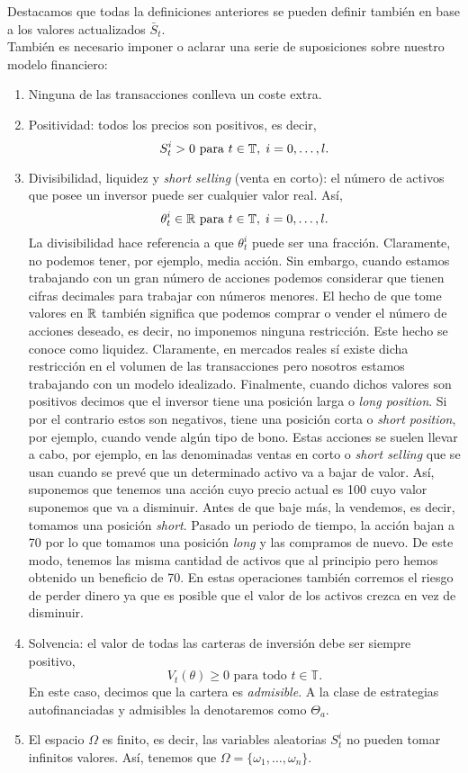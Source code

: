 Destacamos que todas la definiciones anteriores se pueden definir también en base a los valores actualizados $ \bar{S}_t $. \\

También es necesario imponer o aclarar una serie de suposiciones sobre nuestro modelo financiero:
\begin{enumerate}
	\item Ninguna de las transacciones conlleva un coste extra.
	\item Positividad: todos los precios son positivos, es decir,
	\[
	S_t^i > 0 \text{ para } t \in \mathbb{T},\hspace{1mm} i=0,\dots,l.
	\]
	\item Divisibilidad, liquidez y \textit{short selling} (venta en corto): el número de activos que posee un inversor puede ser cualquier valor real. Así,
	\[
	\theta_t^i \in \mathbb{R} \text{ para } t \in \mathbb{T},\hspace{1mm} i=0,\dots,l.
	\]
	La divisibilidad hace referencia a que $ \theta_t^i $ puede ser una fracción. Claramente, no podemos tener, por ejemplo, media acción. Sin embargo, cuando estamos trabajando con un gran número de acciones podemos considerar que tienen cifras decimales para trabajar con números menores. El hecho de que tome valores en $ \mathbb{R} $ también significa que podemos comprar o vender el número de acciones deseado, es decir, no imponemos ninguna restricción. Este hecho se conoce como liquidez. Claramente, en mercados reales sí existe dicha restricción en el volumen de las transacciones pero nosotros estamos trabajando con un modelo idealizado. Finalmente, cuando dichos valores son positivos decimos que el inversor tiene una posición larga o \textit{long position}. Si por el contrario estos son negativos, tiene una posición corta o \textit{short position}, por ejemplo, cuando vende algún tipo de bono. Estas acciones se suelen llevar a cabo, por ejemplo, en las denominadas ventas en corto o \textit{short selling} que se usan cuando se prevé que un determinado activo va a bajar de valor. Así, suponemos que tenemos una acción cuyo precio actual es 100 cuyo valor suponemos que va a disminuir. Antes de que baje más, la vendemos, es decir, tomamos una posición \textit{short}. Pasado un periodo de tiempo, la acción bajan a 70 por lo que tomamos una posición \textit{long} y las compramos de nuevo. De este modo, tenemos las misma cantidad de activos que al principio pero hemos obtenido un beneficio de 70. En estas operaciones también corremos el riesgo de perder dinero ya que es posible que el valor de los activos crezca en vez de disminuir. 
	
	\item Solvencia: el valor de todas las carteras de inversión debe ser siempre positivo,
	\[
	V_t (\theta) \geq 0\text{ para todo } t \in \mathbb{T}.
	\]
	En este caso, decimos que la cartera es \textit{admisible}. A la clase de estrategias autofinanciadas y admisibles la denotaremos como $ \Theta_a $.
	\item El espacio $ \Omega $ es finito, es decir, las variables aleatorias $ S_t^i $ no pueden tomar infinitos valores. Así, tenemos que $ \Omega = \{ \omega_1,\dots,\omega_n\} $.
\end{enumerate}

